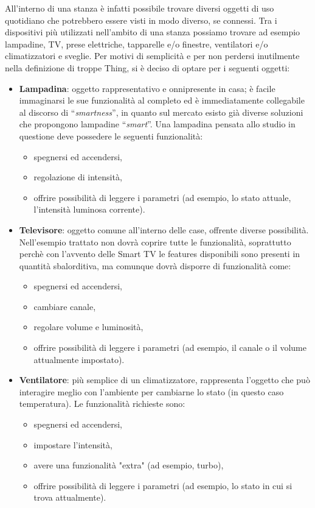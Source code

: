 \documentclass[12pt,a4paper,openright,oneside]{report}
\newcommand{\quotes}[1]{``#1''}
\begin{document}
All'interno di una stanza è infatti possibile trovare diversi oggetti di uso quotidiano che potrebbero essere visti in modo diverso, se connessi. Tra i dispositivi più utilizzati nell'ambito di una stanza possiamo trovare ad esempio lampadine, TV, prese elettriche, tapparelle e/o finestre, ventilatori e/o climatizzatori e sveglie. Per motivi di semplicità e per non perdersi inutilmente nella definizione di troppe Thing, si è deciso di optare per i seguenti oggetti:

\begin{itemize}
	\item \textbf{Lampadina}: oggetto rappresentativo e onnipresente in casa; è facile immaginarsi le sue funzionalità al completo ed è immediatamente collegabile al discorso di \quotes{\textit{smartness}}, in quanto sul mercato esisto già diverse soluzioni che propongono lampadine \quotes{\textit{smart}}. Una lampadina pensata allo studio in questione deve possedere le seguenti funzionalità:
	\begin{itemize}
		\setlength\itemsep{-0.0em}
		\item spegnersi ed accendersi,
		\item regolazione di intensità,
		\item offrire possibilità di leggere i parametri (ad esempio, lo stato attuale, l'intensità luminosa corrente).
	\end{itemize}
	
	\item \textbf{Televisore}: oggetto comune all'interno delle case, offrente diverse possibilità. Nell'esempio trattato non dovrà coprire tutte le funzionalità, soprattutto perchè con l'avvento delle Smart TV le features disponibili sono presenti in quantità sbalorditiva, ma comunque dovrà disporre di funzionalità come:
	\begin{itemize}
		\setlength\itemsep{-0.0em}
		\item spegnersi ed accendersi,
		\item cambiare canale,
		\item regolare volume e luminosità,
		\item offrire possibilità di leggere i parametri (ad esempio, il canale o il volume attualmente impostato).
	\end{itemize}
	
	\item \textbf{Ventilatore}: più semplice di un climatizzatore, rappresenta l'oggetto che può interagire meglio con l'ambiente per cambiarne lo stato (in questo caso temperatura). Le funzionalità richieste sono:
	\begin{itemize}
		\setlength\itemsep{-0.0em}
		\item spegnersi ed accendersi,
		\item impostare l'intensità,
		\item avere una funzionalità "extra" (ad esempio, turbo),
		\item offrire possibilità di leggere i parametri (ad esempio, lo stato in cui si trova attualmente).
	\end{itemize}
	

\end{itemize}
\end{document}
